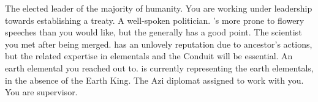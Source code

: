 \documentclass[char]{elementals}
\begin{document}
\begin{contacts}
	\contact{\cLeader{}}  The elected leader of the majority of humanity.  You are working under \cLeader{\their} leadership towards establishing a treaty.
	\contact{\cDema{}}  A well-spoken politician.  \cDema{\They}'s more prone to flowery speeches than you would like, but the \cDema{\human} generally has a good point.
	\contact{\cGD{}}  The scientist you met after being merged.  \cGD{\They} has an unlovely reputation due to \cGD{\their} ancestor's actions, but the related expertise in elementals and the Conduit will be essential.
	\contact{\cLoyal{}}  An earth elemental you reached out to.  \cLoyal{\They} is currently representing the earth elementals, in the absence of the Earth King.
	\contact{\cDiplomat{}}  The Azi diplomat assigned to work with you.  You are \cDiplomat{\their} supervisor.
\end{contacts}
\end{document}

